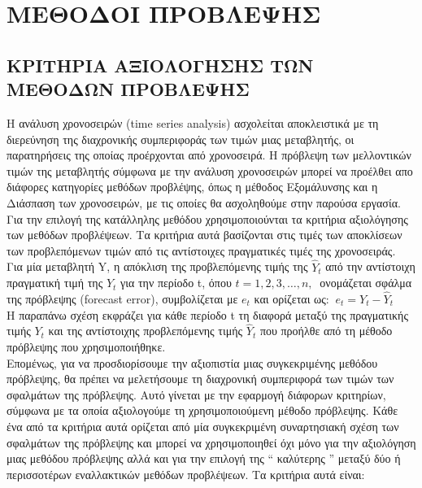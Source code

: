 \chapter{ΜΕΘΟΔΟΙ ΠΡΟΒΛΕΨΗΣ}
\section{ ΚΡΙΤΗΡΙΑ ΑΞΙΟΛΟΓΗΣΗΣ ΤΩΝ ΜΕΘΟΔΩΝ ΠΡΟΒΛΕΨΗΣ}
Η ανάλυση χρονοσειρών (time series analysis) ασχολείται αποκλειστικά με τη
διερεύνηση της διαχρονικής συμπεριφοράς των τιμών μιας μεταβλητής, οι
παρατηρήσεις της οποίας προέρχονται από χρονοσειρά. Η πρόβλεψη των
μελλοντικών τιμών της μεταβλητής σύμφωνα με την ανάλυση χρονοσειρών μπορεί
να προέλθει απο διάφορες κατηγορίες μεθόδων προβλέψης, όπως η μέθοδος Εξομάλυνσης και η Διάσπαση των χρονοσειρών, με τις οποίες θα ασχοληθούμε στην παρούσα εργασία.\\
Για την επιλογή της κατάλληλης μεθόδου χρησιμοποιούνται τα κριτήρια
αξιολόγησης των μεθόδων προβλέψεων. Τα κριτήρια αυτά βασίζονται στις τιμές των
αποκλίσεων των προβλεπόμενων τιμών από τις αντίστοιχες πραγματικές τιμές της
χρονοσειράς.\\
Για μία μεταβλητή Y, η απόκλιση της προβλεπόμενης τιμής της $ \widehat{Y}_t $  από την
αντίστοιχη πραγματική τιμή της $Y_t$ για την περίοδο t, όπου $t=1,2,3,\ldots,n , \:$ ονομάζεται
σφάλμα της πρόβλεψης (forecast error), συμβολίζεται με $e_t$ και ορίζεται ως:
$\: e_t = Y_t - \widehat{Y}_t$\\
Η παραπάνω σχέση εκφράζει για κάθε περίοδο t τη διαφορά μεταξύ της πραγματικής
τιμής $Y_t$ και της αντίστοιχης προβλεπόμενης τιμής $ \widehat{Y}_t $ που προήλθε από τη μέθοδο
πρόβλεψης που χρησιμοποιήθηκε.\\
Επομένως, για να προσδιορίσουμε την αξιοπιστία μιας συγκεκριμένης μεθόδου
πρόβλεψης, θα πρέπει να μελετήσουμε τη διαχρονική συμπεριφορά των τιμών των
σφαλμάτων της πρόβλεψης. Αυτό γίνεται με την εφαρμογή διάφορων κριτηρίων,
σύμφωνα με τα οποία αξιολογούμε τη χρησιμοποιούμενη μέθοδο πρόβλεψης. Κάθε
ένα από τα κριτήρια αυτά ορίζεται από μία συγκεκριμένη συναρτησιακή σχέση των
σφαλμάτων της πρόβλεψης και μπορεί να χρησιμοποιηθεί όχι μόνο για την
αξιολόγηση μιας μεθόδου πρόβλεψης αλλά και για την επιλογή της “ καλύτερης ”
μεταξύ δύο ή περισσοτέρων εναλλακτικών μεθόδων προβλέψεων. Τα κριτήρια αυτά
είναι:\\
